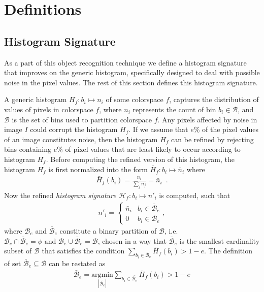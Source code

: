 \section{Definitions}

\subsection{Histogram Signature}
\label{sec:hist_signature}

As a part of this object recognition technique we define a histogram signature that improves on the generic histogram, specifically designed to deal with possible noise in the pixel values. The rest of this section defines this histogram signature.

A generic histogram $H_f:b_i\mapsto n_i$ of some colorspace $f$, captures the distribution of values of pixels in colorspace $f$, where $n_i$ represents the count of bin $b_i \in \mathcal{B}$, and $\mathcal{B}$ is the set of bins used to partition colorspace $f$. Any pixels affected by noise in image $I$ could corrupt the histogram $H_f$. If we assume that $e\%$ of the pixel values of an image constitutes noise, then the histogram $H_f$ can be refined by rejecting bins containing $e\%$ of pixel values that are least likely to occur according to histogram $H_f$. Before computing the refined version of this histogram, the histogram $H_f$ is first normalized into the form $\bar{H}_f:b_i\mapsto \bar{n}_i$ where
%
\begin{align}	\label{eqn:hist_norm}
 \bar{H}_f(b_i)=\frac{n_i}{\sum_{j}n_j}=\bar{n}_i \enspace.
\end{align}
Now the refined \emph{histogram signature} $\mathcal{H}_f:b_i\mapsto n'_i$ is computed, such that
\begin{align}
  n'_i = 
  \begin{cases}
     \bar{n}_i & b_i \in \bar{\mathcal{B}}_e\\
     0	&	b_i \in \mathcal{B}_e
  \end{cases},
\end{align}
%
where $\mathcal{B}_e$ and $\bar{\mathcal{B}}_e$ constitute a binary partition of $\mathcal{B}$, 
i.e. $\mathcal{B}_e \cap \bar{\mathcal{B}}_e = \phi \text{ and } 
\mathcal{B}_e \cup \bar{\mathcal{B}}_e = \mathcal{B}$,
chosen in a way that 
$\bar{\mathcal{B}}_e$ is the smallest cardinality subset of 
$\mathcal{B}$ that satisfies the condition $\sum_{b_i \in \bar{\mathcal{B}}_e} \bar{H}_f(b_i) > 1-e$. 
The definition of set $\bar{\mathcal{B}}_e\subseteq\mathcal{B}$ can be restated as
\begin{align}
 \bar{\mathcal{B}}_e=\underset{|\bar{\mathcal{B}_e}|} {\mathrm{argmin}} \sum_{b_i \in \bar{\mathcal{B}_e}} \bar{H}_f(b_i) > 1-e
\end{align}

